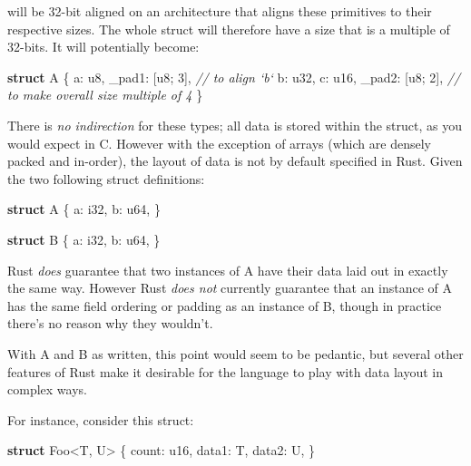 \documentclass[a4paper,]{book}
\newenvironment{Shaded}{\begin{snugshade}}{\end{snugshade}}
\newcommand{\KeywordTok}[1]{\textcolor[rgb]{0.13,0.29,0.53}{\textbf{{#1}}}}
\newcommand{\DataTypeTok}[1]{\textcolor[rgb]{0.13,0.29,0.53}{{#1}}}
\newcommand{\DecValTok}[1]{\textcolor[rgb]{0.00,0.00,0.81}{{#1}}}
\newcommand{\CommentTok}[1]{\textcolor[rgb]{0.56,0.35,0.01}{\textit{{#1}}}}
\newcommand{\NormalTok}[1]{{#1}}
\begin{document}
will be 32-bit aligned on an architecture that aligns these primitives
to their respective sizes. The whole struct will therefore have a size
that is a multiple of 32-bits. It will potentially become:

\begin{Shaded}
\begin{Highlighting}[]
\KeywordTok{struct} \NormalTok{A \{}
    \NormalTok{a: }\DataTypeTok{u8}\NormalTok{,}
    \NormalTok{_pad1: [}\DataTypeTok{u8}\NormalTok{; }\DecValTok{3}\NormalTok{], }\CommentTok{// to align `b`}
    \NormalTok{b: }\DataTypeTok{u32}\NormalTok{,}
    \NormalTok{c: }\DataTypeTok{u16}\NormalTok{,}
    \NormalTok{_pad2: [}\DataTypeTok{u8}\NormalTok{; }\DecValTok{2}\NormalTok{], }\CommentTok{// to make overall size multiple of 4}
\NormalTok{\}}
\end{Highlighting}
\end{Shaded}

There is \emph{no indirection} for these types; all data is stored
within the struct, as you would expect in C. However with the exception
of arrays (which are densely packed and in-order), the layout of data is
not by default specified in Rust. Given the two following struct
definitions:

\begin{Shaded}
\begin{Highlighting}[]
\KeywordTok{struct} \NormalTok{A \{}
    \NormalTok{a: }\DataTypeTok{i32}\NormalTok{,}
    \NormalTok{b: }\DataTypeTok{u64}\NormalTok{,}
\NormalTok{\}}

\KeywordTok{struct} \NormalTok{B \{}
    \NormalTok{a: }\DataTypeTok{i32}\NormalTok{,}
    \NormalTok{b: }\DataTypeTok{u64}\NormalTok{,}
\NormalTok{\}}
\end{Highlighting}
\end{Shaded}

Rust \emph{does} guarantee that two instances of A have their data laid
out in exactly the same way. However Rust \emph{does not} currently
guarantee that an instance of A has the same field ordering or padding
as an instance of B, though in practice there's no reason why they
wouldn't.

With A and B as written, this point would seem to be pedantic, but
several other features of Rust make it desirable for the language to
play with data layout in complex ways.

For instance, consider this struct:

\begin{Shaded}
\begin{Highlighting}[]
\KeywordTok{struct} \NormalTok{Foo<T, U> \{}
    \NormalTok{count: }\DataTypeTok{u16}\NormalTok{,}
    \NormalTok{data1: T,}
    \NormalTok{data2: U,}
\NormalTok{\}}
\end{Highlighting}
\end{Shaded}
\end{document}
